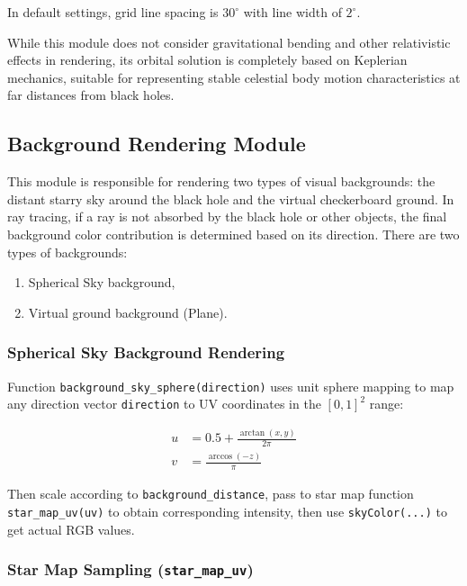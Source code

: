 \documentclass[11pt,a4paper]{article}
\begin{document}
In default settings, grid line spacing is $30^\circ$ with line width of $2^\circ$.

While this module does not consider gravitational bending and other relativistic effects in rendering, its orbital solution is completely based on Keplerian mechanics, suitable for representing stable celestial body motion characteristics at far distances from black holes.

\subsection{Background Rendering Module}

This module is responsible for rendering two types of visual backgrounds: the distant starry sky around the black hole and the virtual checkerboard ground. In ray tracing, if a ray is not absorbed by the black hole or other objects, the final background color contribution is determined based on its direction. There are two types of backgrounds:

\begin{enumerate}
    \item Spherical Sky background,
    \item Virtual ground background (Plane).
\end{enumerate}

\subsubsection{Spherical Sky Background Rendering}

Function \texttt{background\_sky\_sphere(direction)} uses unit sphere mapping to map any direction vector \texttt{direction} to UV coordinates in the $[0,1]^2$ range:

\begin{align}
u &= 0.5 + \frac{\arctan(x, y)}{2\pi} \\
v &= \frac{\arccos(-z)}{\pi}
\end{align}

Then scale according to \texttt{background\_distance}, pass to star map function \texttt{star\_map\_uv(uv)} to obtain corresponding intensity, then use \texttt{skyColor(...)} to get actual RGB values.

\subsubsection{Star Map Sampling (\texttt{star\_map\_uv})}
\end{document}
